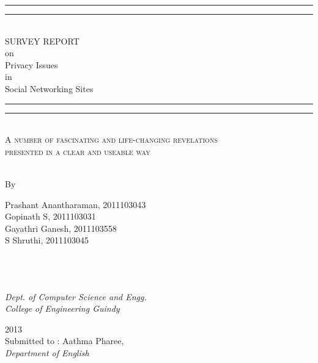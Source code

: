 \newcommand*{\titleGP}{\begingroup %
\centering %
\vspace*{\baselineskip} %

\rule{\textwidth}{1.6pt}\vspace*{-\baselineskip}\vspace*{2pt} %
\rule{\textwidth}{0.4pt}\\[\baselineskip] %

{\LARGE SURVEY REPORT\\on\\Privacy Issues\\ in \\Social Networking Sites}\\[0.2\baselineskip] %

\rule{\textwidth}{0.4pt}\vspace*{-\baselineskip}\vspace{3.2pt} %
\rule{\textwidth}{1.6pt}\\[\baselineskip] %

\scshape %
A number of fascinating and life-changing revelations \\ %
presented  in a clear and useable way \\[\baselineskip] %
\\
\vspace*{2\baselineskip} %

By\\[\baselineskip]
{\Large Prashant Anantharaman, 2011103043 \\ Gopinath S, 2011103031 \\ Gayathri Ganesh, 2011103558 \\ S Shruthi, 2011103045\\\\\par} %
{\itshape \\\\Dept. of Computer Science and Engg. \\ College of Engineering Guindy\par} %

\vfill %
{\scshape 2013} \\[0.3\baselineskip] %
{\large }Submitted to : Aathma Pharee, \\\emph{Department of English} %


\endgroup}


 

\pagestyle{empty} %

\titleGP %



